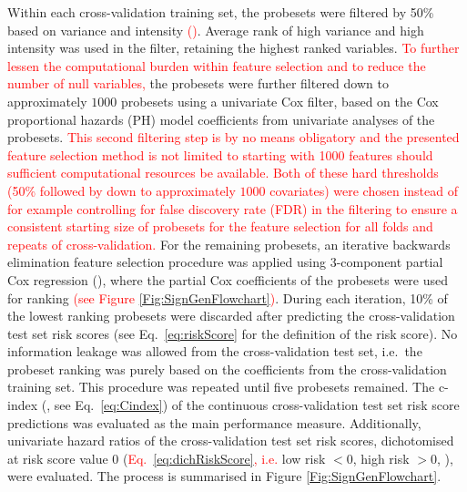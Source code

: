 \documentclass[letterpaper,12pt]{article}
\begin{document}
Within each cross-validation training set, the probesets were filtered by 50\% based on variance and intensity \textcolor{red}{(\citet{Hackstadt:09})}. Average rank of high variance and high intensity was used in the filter, retaining the highest ranked variables. \textcolor{red}{To further lessen the computational burden within feature selection and to reduce the number of null variables,} the probesets were further filtered down to approximately $1000$ probesets using a univariate Cox filter, based on the Cox proportional hazards (PH) model coefficients from univariate analyses of the probesets. \textcolor{red}{This second filtering step is by no means obligatory and the presented feature selection method is not limited to starting with 1000 features should sufficient computational resources be available. Both of these hard thresholds (50\% followed by down to approximately $1000$ covariates) were chosen instead of for example controlling for false discovery rate (FDR) in the filtering to ensure a consistent starting size of probesets for the feature selection for all folds and repeats of cross-validation.} For the remaining probesets, an iterative backwards elimination feature selection procedure was applied using 3-component partial Cox regression (\citet{Li:04}), where the partial Cox coefficients of the probesets were used for ranking \textcolor{red}{(see Figure \ref{Fig:SignGenFlowchart})}. During each iteration, 10\% of the lowest ranking probesets were discarded after predicting the cross-validation test set risk scores (see Eq.\ \ref{eq:riskScore} for the definition of the risk score). No information leakage was allowed from the cross-validation test set, i.e.\ the probeset ranking was purely based on the coefficients from the cross-validation training set. This procedure was repeated until five probesets remained. The c-index (\citet{Harrell:10}, see Eq.\ \ref{eq:Cindex}) of the continuous cross-validation test set risk score predictions was evaluated as the main performance measure. Additionally, univariate hazard ratios of the cross-validation test set risk scores, dichotomised at risk score value $0$ (\textcolor{red}{Eq.\ \ref{eq:dichRiskScore}, i.e. }low risk $<0$, high risk $>0$, \citet{Li:04}), were evaluated. The process is summarised in Figure \ref{Fig:SignGenFlowchart}.
\end{document}
